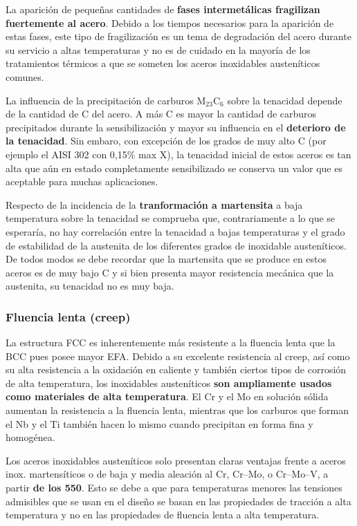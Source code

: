 La aparición de pequeñas cantidades de \textbf{fases intermetálicas fragilizan fuertemente al acero}. Debido a los tiempos necesarios para la aparición de estas fases, este tipo de fragilización es un tema de degradación del acero durante su servicio a altas temperaturas y no es de cuidado en la mayoría de los tratamientos térmicos a que se someten los aceros inoxidables austeníticos comunes.

La influencia de la precipitación de carburos M$_{23}$C$_6$ sobre la tenacidad depende de la cantidad de C del acero. A más C es mayor la cantidad de carburos precipitados durante la sensibilización y mayor su influencia en el \textbf{deterioro de la tenacidad}. Sin embaro, con excepción de los grados de muy alto C (por ejemplo el AISI 302 con 0,15\% max X), la tenacidad inicial de estos aceros es tan alta que aún en estado completamente sensibilizado se conserva un valor que es aceptable para muchas aplicaciones. 

Respecto de la incidencia de la \textbf{tranformación a martensita} a baja temperatura sobre la tenacidad se comprueba que, contrariamente a lo que se esperaría, no hay correlación entre la tenacidad a bajas temperaturas y el grado de estabilidad de la austenita de los diferentes grados de inoxidable austeníticos. De todos modos se debe recordar que la martensita que se produce en estos aceros es de muy bajo C y si bien presenta mayor resistencia mecánica que la austenita, su tenacidad no es muy baja.

\subsubsection{Fluencia lenta (creep)}

La estructura FCC es inherentemente más resistente a la fluencia lenta que la BCC pues posee mayor EFA. Debido a su excelente resistencia al creep, así como su alta resistencia a la oxidación en caliente y también ciertos tipos de corrosión de alta temperatura, los inoxidables austeníticos \textbf{son ampliamente usados como materiales de alta temperatura}. El Cr y el Mo en solución sólida aumentan la resistencia a la fluencia lenta, mientras que los carburos que forman el Nb y el Ti también hacen lo mismo cuando precipitan en forma fina y homogénea.

Los aceros inoxidables austeníticos solo presentan claras ventajas frente a aceros inox. martensíticos o de baja y media aleación al Cr, Cr--Mo, o Cr--Mo--V, a partir \textbf{de los 550\grad}. Esto se debe a que para temperaturas menores las tensiones admisibles que se usan en el diseño se basan en las propiedades de tracción a alta temperatura y no en las propiedades de fluencia lenta a alta temperatura.


